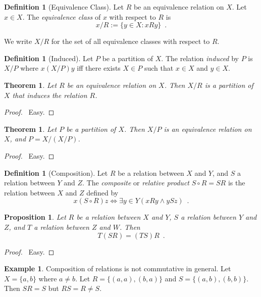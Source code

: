 \documentclass{report}
\let\qed\relax
\newtheorem{prop}[ax]{Proposition}
\newtheorem{thm}[ax]{Theorem}
\theoremstyle{definition}
\newtheorem{df}[ax]{Definition}
\newtheorem{ex}[ax]{Example}
\begin{document}
\begin{df}[Equivalence Class]
Let $R$ be an equivalence relation on $X$. Let $x \in X$. The \emph{equivalence class} of $x$ with respect to $R$ is \[ x / R := \{ y \in X : x R y \} \enspace . \]

We write $X / R$ for the set of all equivalence classes with respect to $R$.
\end{df}

\begin{df}[Induced]
Let $P$ be a partition of $X$. The relation \emph{induced} by $P$ is $X/P$ where $x (X/P) y$ iff there exists $X \in P$ such that $x \in X$ and $y \in X$.
\end{df}

\begin{thm}
Let $R$ be an equivalence relation on $X$. Then $X / R$ is a partition of $X$ that induces the relation $R$.
\end{thm}

\begin{proof}
\pf\ Easy. \qed
\end{proof}

\begin{thm}
Let $P$ be a partition of $X$. Then $X / P$ is an equivalence relation on $X$, and $P = X / (X / P)$.
\end{thm}

\begin{proof}
\pf\ Easy. \qed
\end{proof}

\begin{df}[Composition]
Let $R$ be a relation between $X$ and $Y$, and $S$ a relation between $Y$ and $Z$. The \emph{composite} or \emph{relative product} $S \circ R = SR$ is the relation between $X$ and $Z$ defined by
\[ x (S \circ R) z \Leftrightarrow \exists y \in Y (xRy \wedge ySz) \enspace . \]
\end{df}

\begin{prop}
Let $R$ be a relation between $X$ and $Y$, $S$ a relation between $Y$ and $Z$, and $T$ a relation between $Z$ and $W$. Then
\[ T(SR) = (TS)R \enspace . \]
\end{prop}

\begin{proof}
\pf\ Easy. \qed
\end{proof}

\begin{ex}
\label{ex:composition_not_commutative}
Composition of relations is not commutative in general. Let $X = \{a,b\}$ where $a \neq b$. Let $R = \{(a,a),(b,a)\}$ and $S = \{(a,b),(b,b)\}$. Then $SR = S$ but $RS = R \neq S$.
\end{ex}
\end{document}
